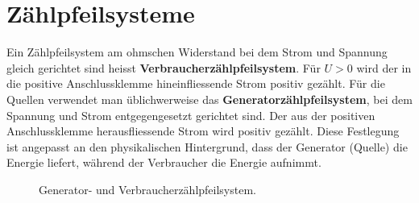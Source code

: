 \section{Zählpfeilsysteme}
Ein Zählpfeilsystem am ohmschen Widerstand bei dem Strom und Spannung gleich gerichtet sind heisst \textbf{Verbraucherzählpfeilsystem}. Für $U>0$ wird der in die positive Anschlussklemme hineinfliessende Strom positiv gezählt. 
\newline\newline
Für die Quellen verwendet man üblichwerweise das \textbf{Generatorzählpfeilsystem}, bei dem Spannung und Strom entgegengesetzt gerichtet sind. Der aus der positiven Anschlussklemme herausfliessende Strom wird positiv gezählt. Diese Festlegung ist angepasst an den physikalischen Hintergrund, dass der Generator (Quelle) die Energie liefert, während der Verbraucher die Energie aufnimmt.
\begin{figure}[H]
\quad
{}
\centering
\caption{Generator- und Verbraucherzählpfeilsystem.}
\label{fig_IIIe}
\end{figure}
